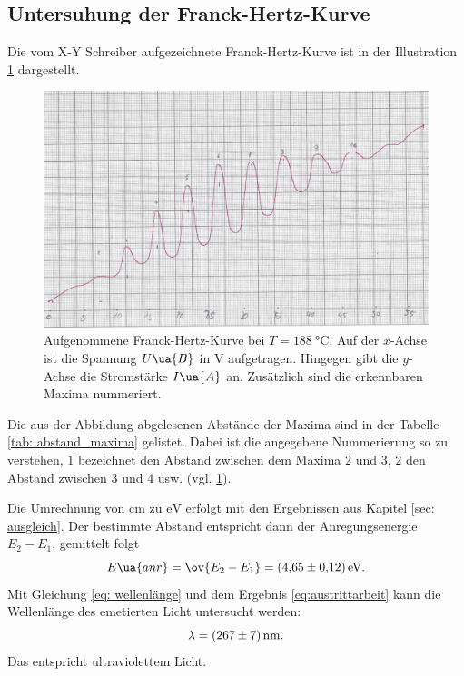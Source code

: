 \subsection{Untersuhung der Franck-Hertz-Kurve}\label{sec: frank}
\FloatBarrier
Die vom X-Y Schreiber aufgezeichnete Franck-Hertz-Kurve ist in der Illustration \ref{fig: messkurve_frank_hertz} dargestellt.
\begin{figure}
  \centering
  \includegraphics[width=0.8 \textwidth]{./pics/frank_hertz_kurve.png}
  \caption{Aufgenommene Franck-Hertz-Kurve bei $T=\SI{188}{\celsius}$. Auf der $x$-Achse ist die Spannung $U\ua{B}$ in $\si{\volt}$ aufgetragen.
          Hingegen gibt die $y$-Achse die Stromstärke $I\ua{A}$ an. Zusätzlich sind die erkennbaren Maxima nummeriert.}
  \label{fig: messkurve_frank_hertz}
\end{figure}
Die aus der Abbildung abgelesenen Abstände der Maxima sind in der Tabelle \ref{tab: abstand_maxima} gelistet.
Dabei ist die angegebene Nummerierung so zu verstehen, $1$ bezeichnet den Abstand zwischen dem Maxima $2$ und $3$, $2$ den Abstand zwischen $3$ und $4$ usw. (vgl. \ref{fig: messkurve_frank_hertz}).

Die Umrechnung von $\si{\centi\meter}$ zu $\si{\eV}$ erfolgt mit den Ergebnissen aus Kapitel \ref{sec: ausgleich}.
Der bestimmte Abstand entspricht dann der Anregungsenergie $E_2-E_1$, gemittelt folgt
\begin{equation}
  \label{eq:austrittarbeit}
E\ua{anr}=\ov{E_2-E_1}=\SI{4.65\pm0.12}{\eV}.
\end{equation}
Mit Gleichung \eqref{eq: wellenlänge} und dem Ergebnis \eqref{eq:austrittarbeit} kann die Wellenlänge des emetierten Licht untersucht werden:
\begin{equation}
  \label{eq: lambda}
  \lambda=\SI{267\pm7}{\nano\meter}.
\end{equation}
Das entspricht ultraviolettem Licht.

